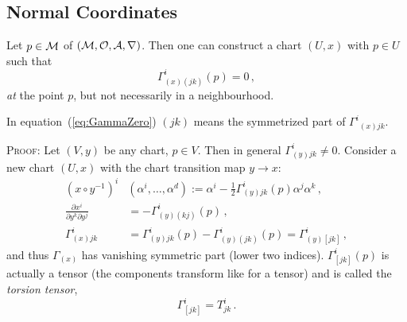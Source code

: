 \documentclass[11pt, a4paper, twocolumn]{article} %
\begin{document}
\subsection{Normal Coordinates}
Let $p\in \mathcal{M}$ of $(\mathcal{M}, \mathcal{O}, \mathcal{A}, \nabla)$.
Then one can construct a chart $(U,x)$ with $p\in U$ such that
\begin{equation}
    \Gamma^i_{(x)(jk)}(p) = 0\,,
    \label{eq:GammaZero}
\end{equation}
\textit{at} the point $p$, but not necessarily in a neighbourhood.
\begin{note}
    In equation~(\ref{eq:GammaZero}) $(jk)$ means the symmetrized part of $\Gamma^i{}_{(x)jk}$.
\end{note}

\textsc{Proof}: Let $(V,y)$ be any chart, $p\in V$.
Then in general $\Gamma^i_{(y)jk}\neq 0$.
Consider a new chart $(U,x)$ with the chart transition map $y \to x$:
\begin{align*}
    (x\circ y^{-1})^i&(\alpha^i, \ldots, \alpha^d) := \alpha^i - \frac{1}{2} \Gamma^i_{(y)jk}(p) \alpha^j \alpha^k\,,\\
    \frac{\partial x^i}{\partial y^k \partial y^j} &= - \Gamma^i_{(y)(kj)}(p)\,,\\
    \Gamma^i_{(x)jk} &= \Gamma^i_{(y)jk}(p) - \Gamma^i_{(y)(jk)}(p) = \Gamma^i_{(y)[jk]}\,,
\end{align*}
and thus $\Gamma_{(x)}$ has vanishing symmetric part (lower two indices).
$\Gamma^i_{[jk]}(p)$ is actually a tensor (the components transform like for a tensor) and is called the
\textit{torsion tensor},
\begin{equation}
    \Gamma^i_{[jk]} = T^{i}_{jk}\,.
\end{equation}



\printbibliography[title={Bibliography}] %

\end{document}
